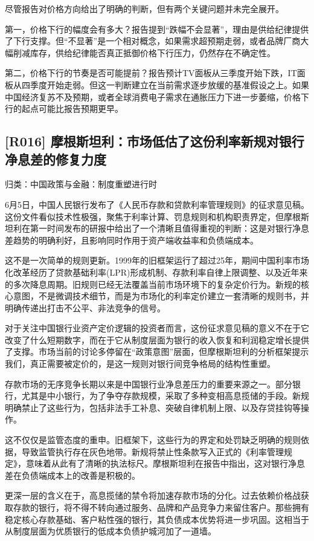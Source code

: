 \documentclass[11pt]{ctexart}
\begin{document}
尽管报告对价格方向给出了明确的判断，但有两个关键问题并未完全展开。

第一，价格下行的幅度会有多大？报告提到“跌幅不会显著”，理由是供给纪律提供了下行支撑。但“不显著”是一个相对概念，如果需求超预期走弱，或者品牌厂商大幅削减库存，供给纪律能否真正抵御价格下行压力，仍然存在不确定性。

第二，价格下行的节奏是否可能提前？报告预计TV面板从三季度开始下跌，IT面板从四季度开始走弱。但这一判断建立在当前需求逐步放缓的基准假设之上。如果中国经济复苏不及预期，或者全球消费电子需求在通胀压力下进一步萎缩，价格下行的起点可能比报告预期更早。

\subsection{[R016] 摩根斯坦利：市场低估了这份利率新规对银行净息差的修复力度}
{\small\color{refgray}归类：中国政策与金融：制度重塑进行时}

6月5日，中国人民银行发布了《人民币存款和贷款利率管理规则》的征求意见稿。这份文件看似技术性极强，聚焦于利率计算、罚息规则和机构职责界定，但摩根斯坦利在第一时间发布的研报中给出了一个清晰且值得重视的判断：这是对银行净息差趋势的明确利好，且影响同时作用于资产端收益率和负债端成本。

这不是一次简单的规则更新。1999年的旧框架运行了超过25年，期间中国利率市场化改革经历了贷款基础利率(LPR)形成机制、存款利率自律上限调整、以及近年来的多次降息周期。旧规则已经无法覆盖当前市场环境下的复杂定价行为。新规的核心意图，不是微调技术细节，而是为市场化的利率定价建立一套清晰的规则书，并明确传递出打击不公平、非法竞争的信号。

对于关注中国银行业资产定价逻辑的投资者而言，这份征求意见稿的意义不在于它改变了什么短期数字，而在于它从制度层面为银行的收入恢复和利润稳定增长提供了支撑。市场当前的讨论多停留在“政策意图”层面，但摩根斯坦利的分析框架提示我们，真正需要被定价的，是这一规则对银行间竞争格局的结构性重塑。

存款市场的无序竞争长期以来是中国银行业净息差压力的重要来源之一。部分银行，尤其是中小银行，为了争夺存款规模，采取了多种变相高息揽储的手段。新规明确禁止了这些行为，包括非法手工补息、突破自律机制上限、以及存贷挂钩等操作。

这不仅仅是监管态度的重申。旧框架下，这些行为的界定和处罚缺乏明确的规则依据，导致监管执行存在灰色地带。新规将禁止性条款写入正式的《利率管理规定》，意味着从此有了清晰的执法标尺。摩根斯坦利在报告中指出，这对银行净息差在负债端成本上的改善是积极的。

更深一层的含义在于，高息揽储的禁令将加速存款市场的分化。过去依赖价格战获取存款的银行，将不得不转向通过服务、品牌和产品竞争力来留住客户。那些拥有稳定核心存款基础、客户粘性强的银行，其负债成本优势将进一步巩固。这相当于从制度层面为优质银行的低成本负债护城河加了一道墙。
\end{document}
